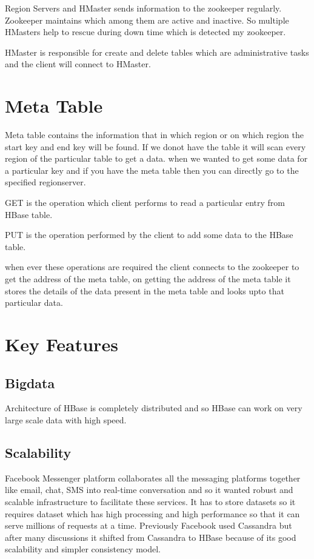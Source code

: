  Region Servers and HMaster sends information to the zookeeper regularly. 
Zookeeper maintains which among them are active and inactive. So multiple 
HMasters help to rescue during down time which is detected my zookeeper. 

 HMaster is responsible for create and delete tables which are administrative 
 tasks and the client will connect to HMaster.

 \section{Meta Table} Meta table contains the information that in which region or
 on which region the start key and end key will be found. If we donot have the 
 table it will scan every region of the particular table to get a data. when we 
 wanted to get some data for a particular key and if you have the meta table then 
 you can directly go to the specified regionserver.
 \begin{description}
 \item GET is the operation which client performs to read a particular entry from
  HBase table.
\item PUT is the operation performed by the client to add some data to the HBase
 table.
\end{description}
 when ever these operations are required the client connects to the zookeeper to
 get the address of the meta table, on getting the address of the meta table it 
 stores the details of the data present in the meta table and looks upto that 
 particular data. 



\section{Key Features}

\subsection{Bigdata}

Architecture of HBase is completely distributed and so HBase can work on very 
large scale data with high speed. 

\subsection{Scalability} 

Facebook Messenger platform collaborates all the messaging platforms together 
like email, chat, SMS into real-time conversation and so it wanted robust and 
scalable infrastructure to facilitate these services. It has to store 
datasets so it requires dataset which has high processing and high performance
so that it can serve millions of requests at a time. Previously Facebook used 
Cassandra but after many discussions it shifted from Cassandra to HBase because
of its good scalability and simpler consistency model. 


